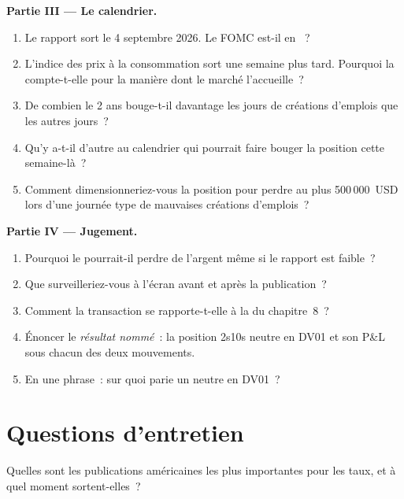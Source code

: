 \begin{problem}
\medskip\noindent\textbf{Partie III --- Le calendrier.}
\begin{enumerate}[resume]
\item Le rapport sort le 4 septembre 2026. Le FOMC est-il en ~?
\item L'indice des prix à la consommation sort une semaine plus tard. Pourquoi la  compte-t-elle pour la manière dont le marché l'accueille~?
\item De combien le 2 ans bouge-t-il davantage les jours de créations d'emplois que les autres jours~?
\item Qu'y a-t-il d'autre au calendrier qui pourrait faire bouger la position cette semaine-là~?
\item Comment dimensionneriez-vous la position pour perdre au plus 500\,000~USD lors d'une
journée type de mauvaises créations d'emplois~?
\end{enumerate}

\medskip\noindent\textbf{Partie IV --- Jugement.}
\begin{enumerate}[resume]
\item Pourquoi le  pourrait-il perdre de l'argent même si le rapport est faible~?
\item Que surveilleriez-vous à l'écran avant et après la publication~?
\item Comment la transaction se rapporte-t-elle à la  du chapitre~8~?
\item Énoncer le \emph{résultat nommé}~: la position  2s10s neutre en DV01 et son P\&L sous
chacun des deux mouvements.
\item En une phrase~: sur quoi parie un  neutre en DV01~?
\end{enumerate}
\end{problem}

\section{Questions d'entretien}

\begin{interviewq}\label{iq:m2:reading-a-macro-calendar-and-a-rates-screen:1}
Quelles sont les publications américaines les plus importantes pour les taux, et à quel moment sortent-elles~?
\end{interviewq}

